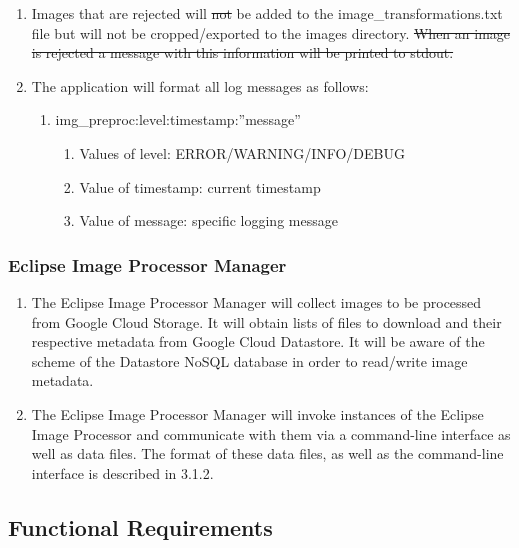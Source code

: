 \documentclass[10pt, onecolumn, draftclsnofoot, letterpaper, compsoc]{IEEEtran}
\begin{document}
\begin{enumerate}
		 \item Images that are rejected will \sout{not} be added to the
		 image\_transformations.txt file but will not be cropped/exported to
		 the images directory. \sout{When an image is rejected a message with this
		 information will be printed to stdout.}

		 \item The application will format all log messages as follows:
		 \begin{enumerate}
		 	\item img\_preproc:level:timestamp:”message”
		 	\begin{enumerate}
		 		\item Values of level: ERROR/WARNING/INFO/DEBUG
		 		\item Value of timestamp: current timestamp
		 		\item Value of message: specific logging message
		 	\end{enumerate}
		 \end{enumerate}
	\end{enumerate}

\subsubsection{Eclipse Image Processor Manager}
	\begin{enumerate}
		\item The Eclipse Image Processor Manager will collect images to be processed
		from Google Cloud Storage. It will obtain lists of files to download and their
		respective metadata from Google Cloud Datastore. It will be aware of the scheme
		of the Datastore NoSQL database in order to read/write image metadata.

		\item The Eclipse Image Processor Manager will invoke instances of the Eclipse
		Image Processor and communicate with them via a command-line interface as well
		as data files. The format of these data files, as well as the command-line interface
		is described in 3.1.2.
	\end{enumerate}

\subsection{Functional Requirements}
\end{document}
